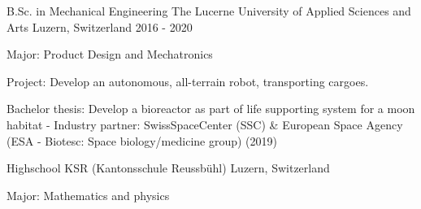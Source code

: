 

\begin{cventries}

\cventry
{B.Sc. in Mechanical Engineering} %
{The Lucerne University of Applied Sciences and Arts} %
{Luzern, Switzerland} %
{2016 - 2020} %
{
	\begin{cvitems} %
		\item {Major: Product Design and Mechatronics}
		\item {Project: Develop an autonomous, all-terrain robot, transporting cargoes.}
		\item {Bachelor thesis: Develop a bioreactor as part of life supporting system for a moon habitat - \newline Industry partner: \mbox{SwissSpaceCenter} (SSC) \& European Space Agency (ESA - Biotesc: Space biology/medicine group) (2019)}
	\end{cvitems}
}



  \cventry
    {Highschool} %
    {KSR (Kantonsschule Reussbühl)} %
    {Luzern, Switzerland} %
    {} %
    {
      \begin{cvitems} %
        \item {Major: Mathematics and physics}
      \end{cvitems}
    }

\end{cventries}
